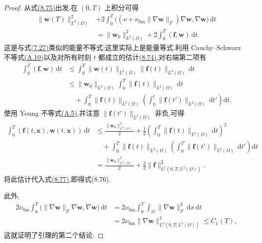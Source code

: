 \begin{proof}
从式\hyperref[eq:smagorinsky-energy-identity]{(8.75)}出发,在 $(0,T)$ 上积分可得
\begin{equation}\label{eq:smagorinsky-energy-integrated}
\begin{aligned}
 \|\bm{w}(T)\|_{L^2(\Omega)}^2
 &+2\int_0^T
  \bigl((\nu+\nu_{\mathrm{Sm}}\|\nabla\bm{w}\|_F)
         \nabla\bm{w},\nabla\bm{w}\bigr)\,\mathrm{d}t\\
 &=\|\bm{w}_0\|_{L^2(\Omega)}^2
   +2\int_0^T(\bm{f},\bm{w})\,\mathrm{d}t.
\end{aligned}
\end{equation}
这是与式\hyperref[eq:time-dependent-energy-inequality]{(7.27)}类似的能量不等式;这里实际上是能量等式.利用 Cauchy--Schwarz 不等式\hyperref[eq:appendix-a-10]{(A.10)}以及对所有时刻 $t$ 都成立的估计\hyperref[eq:smagorinsky-l2-stability]{(8.74)},对右端第二项有
\[
\begin{aligned}
 \int_0^T(\bm{f},\bm{w})\,\mathrm{d}t
 &\le \int_0^T
       \|\bm{w}(t)\|_{L^2(\Omega)}
       \|\bm{f}(t)\|_{L^2(\Omega)}\,\mathrm{d}t\\
 &\le \|\bm{w}_0\|_{L^2(\Omega)}
       \int_0^T\|\bm{f}(t)\|_{L^2(\Omega)}\,\mathrm{d}t\\
 &\quad+\int_0^T\|\bm{f}(t)\|_{L^2(\Omega)}
       \left(\int_0^t\|\bm{f}(t')\|_{L^2(\Omega)}\,\mathrm{d}t'\right)\mathrm{d}t.
\end{aligned}
\]
使用 Young 不等式\hyperref[eq:appendix-a-5]{(A.5)},并注意 $\|\bm{f}(t')\|_{L^2(\Omega)}$ 非负,可得
\[
\begin{aligned}
 \int_0^T(\bm{f}(t,\bm{x}),\bm{w}(t,\bm{x}))\,\mathrm{d}t
 &\le \frac{\|\bm{w}_0\|_{L^2(\Omega)}^2}{2}
   +\frac12\left(\int_0^T
      \|\bm{f}(t)\|_{L^2(\Omega)}\,\mathrm{d}t\right)^2\\
 &\quad+\int_0^T\|\bm{f}(t)\|_{L^2(\Omega)}
      \left(\int_0^T\|\bm{f}(t')\|_{L^2(\Omega)}\,\mathrm{d}t'\right)\mathrm{d}t\\
 &=\frac{\|\bm{w}_0\|_{L^2(\Omega)}^2}{2}
   +\frac32\|\bm{f}\|_{L^1(0,T;L^2(\Omega))}^2.
\end{aligned}
\]
将此估计代入式\hyperref[eq:smagorinsky-energy-integrated]{(8.77)},即得式(8.76).

此外,
\[
\begin{aligned}
 2\nu_{\mathrm{Sm}}\int_0^T
   \bigl(\|\nabla\bm{w}\|_F\nabla\bm{w},
                      \nabla\bm{w}\bigr)\,\mathrm{d}t
 &=2\nu_{\mathrm{Sm}}\int_0^T\int_\Omega
       \|\nabla\bm{w}\|_F^3\,\mathrm{d}x\,\mathrm{d}t\\
 &=2\nu_{\mathrm{Sm}}
       \|\nabla\bm{w}\|_{L^3(0,T;L^3(\Omega))}^3
 \le C_1(T),
\end{aligned}
\]
这就证明了引理的第二个结论.
\end{proof}

